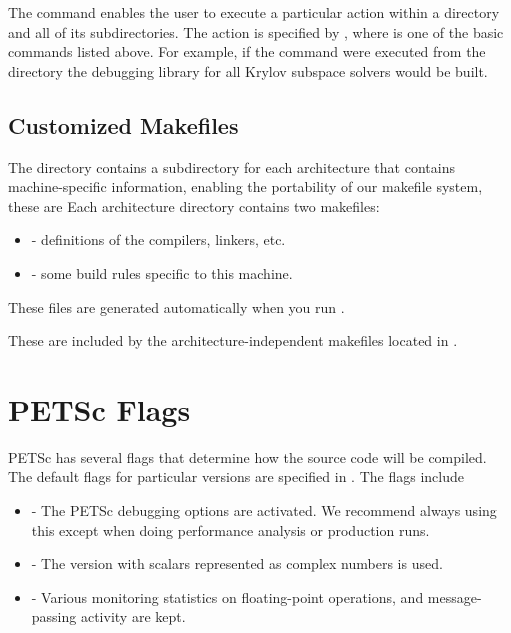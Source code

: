 {{The  command enables the user to execute a particular action
within a directory and all of its subdirectories.  The action is specified
by , where  is one of the basic commands
listed above. For example, if the command
were executed from the directory 
the debugging library for all Krylov subspace solvers would be built.

\subsection{Customized Makefiles}
\label{sec_custom}

The directory  contains a subdirectory for each
architecture that contains machine-specific information, enabling the
portability of our makefile system, these are 
 Each architecture directory contains
two makefiles:
\begin{itemize}
\item {} - definitions of the compilers, linkers, etc.
\item {} - some build rules specific to this machine.
\end{itemize}
These files are generated automatically when you run .

These are included by the architecture-independent makefiles located in
.

\section{PETSc Flags}
\label{sec_makeflags}

PETSc has several flags that determine how the source code will be
compiled.  The default flags for particular versions are specified in
.
The flags include
\begin{itemize}
\item {} - The PETSc debugging options are activated. We
      recommend always using this except when doing performance analysis or production runs. 
\item {} - The version with scalars represented
      as complex numbers is used. 
\item {} - Various monitoring statistics on floating-point operations,
      and message-passing activity are kept. 
\end{itemize}

}}
